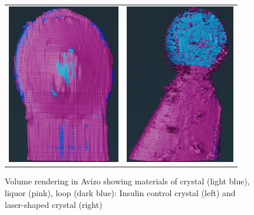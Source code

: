 \begin{figure}[h]
    \begin{tabular}{cc}
	\includegraphics[height=7cm]{images/avizo_flats/ins_con.jpg} & \includegraphics[height=7cm]{images/avizo_flats/ins_ls.jpg}
    \end{tabular}
	\caption{Volume rendering in Avizo showing materials of crystal (light blue), liquor (pink), loop (dark blue): Insulin control crystal (left) and laser-shaped crystal (right)}
 \label{avizo_insulin}
\end{figure}


